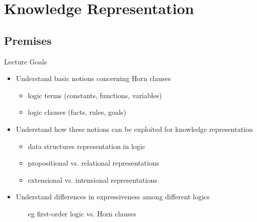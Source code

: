 \documentclass[presentation]{beamer}\mode<presentation>{\usetheme{AMSBolognaFC}}
\begin{document}
\section{Knowledge Representation}


\subsection{Premises}

\begin{frame}{Lecture Goals}
    \begin{itemize}
        \item Understand basic notions concerning \alert{Horn clauses}
        \begin{itemize}
            \item logic terms (constants, functions, variables)
            \item logic clauses (facts, rules, goals)
        \end{itemize}

        \vfill

        \item Understand how these notions can be exploited for \alert{knowledge representation}
        \begin{itemize}
            \item data structures representation in logic
            \item propositional vs. relational representations
            \item extensional vs. intensional representations
        \end{itemize}

        \vfill

        \item Understand differences in expressiveness among different logics
        \begin{itemize}
            \item[eg] first-order logic vs. Horn clauses
        \end{itemize}
    \end{itemize}
\end{frame}
\end{document}
